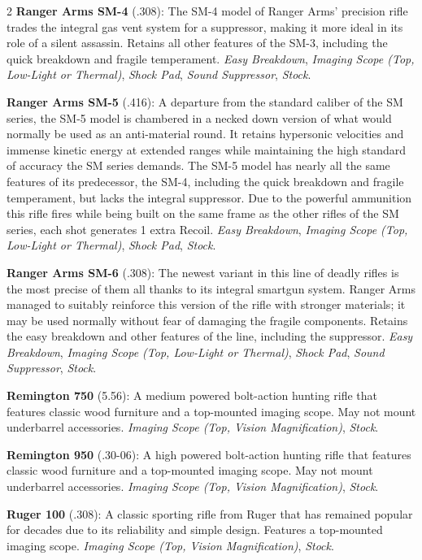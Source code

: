 \documentclass[
  oneside]{article}
\begin{document}
\begin{multicols}{2}
\textbf{Ranger Arms SM-4} (.308): The SM-4 model
of Ranger Arms' precision rifle trades the
integral gas vent system for a suppressor, making
it more ideal in its role of a silent assassin.
Retains all other features of the SM-3, including
the quick breakdown and fragile temperament.
\emph{Easy Breakdown}, \emph{Imaging Scope (Top,
Low-Light or Thermal)}, \emph{Shock Pad},
\emph{Sound Suppressor}, \emph{Stock}.

\textbf{Ranger Arms SM-5} (.416): A departure from
the standard caliber of the SM series, the SM-5
model is chambered in a necked down version of
what would normally be used as an anti-material
round. It retains hypersonic velocities and
immense kinetic energy at extended ranges while
maintaining the high standard of accuracy the SM
series demands. The SM-5 model has nearly all the
same features of its predecessor, the SM-4,
including the quick breakdown and fragile
temperament, but lacks the integral suppressor.
Due to the powerful ammunition this rifle fires
while being built on the same frame as the other
rifles of the SM series, each shot generates 1
extra Recoil. \emph{Easy Breakdown}, \emph{Imaging
Scope (Top, Low-Light or Thermal)}, \emph{Shock
Pad}, \emph{Stock}.

\textbf{Ranger Arms SM-6} (.308): The newest
variant in this line of deadly rifles is the most
precise of them all thanks to its integral
smartgun system. Ranger Arms managed to suitably
reinforce this version of the rifle with stronger
materials; it may be used normally without fear of
damaging the fragile components. Retains the easy
breakdown and other features of the line,
including the suppressor. \emph{Easy Breakdown},
\emph{Imaging Scope (Top, Low-Light or Thermal)},
\emph{Shock Pad}, \emph{Sound Suppressor},
\emph{Stock}.

\textbf{Remington 750} (5.56): A medium powered
bolt-action hunting rifle that features classic
wood furniture and a top-mounted imaging scope.
May not mount underbarrel accessories.
\emph{Imaging Scope (Top, Vision Magnification)},
\emph{Stock}.

\textbf{Remington 950} (.30-06): A high powered
bolt-action hunting rifle that features classic
wood furniture and a top-mounted imaging scope.
May not mount underbarrel accessories.
\emph{Imaging Scope (Top, Vision Magnification)},
\emph{Stock}.

\textbf{Ruger 100} (.308): A classic sporting
rifle from Ruger that has remained popular for
decades due to its reliability and simple design.
Features a top-mounted imaging scope.
\emph{Imaging Scope (Top, Vision Magnification)},
\emph{Stock}.


\end{multicols}
\end{document}
